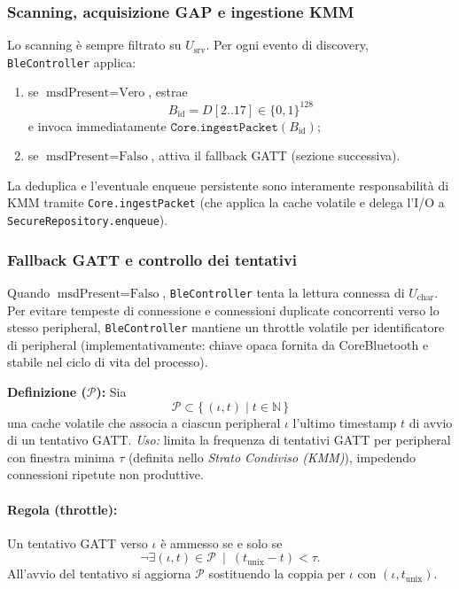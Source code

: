 \documentclass[a4paper,11pt,table,dvipsnames]{article}
\begin{document}
\subsubsection{Scanning, acquisizione GAP e ingestione KMM}
Lo scanning è sempre filtrato su \(U_{\text{srv}}\). Per ogni evento di discovery, \texttt{BleController} applica:
\begin{enumerate}
    \item se \(\text{msdPresent}=\text{Vero}\), estrae
          \[
              B_{\text{id}} = D[2..17] \in \{0,1\}^{128}
          \]
          e invoca immediatamente \(\texttt{Core.ingestPacket}(B_{\text{id}})\);
    \item se \(\text{msdPresent}=\text{Falso}\), attiva il fallback GATT (sezione successiva).
\end{enumerate}
La deduplica e l’eventuale enqueue persistente sono interamente responsabilità di KMM tramite \texttt{Core.ingestPacket} (che applica la cache volatile e delega l’I/O a \texttt{SecureRepository.enqueue}).

\subsubsection{Fallback GATT e controllo dei tentativi}
Quando \(\text{msdPresent}=\text{Falso}\), \texttt{BleController} tenta la lettura connessa di \(U_{\text{char}}\). Per evitare tempeste di connessione e connessioni duplicate concorrenti verso lo stesso peripheral, \texttt{BleController} mantiene un throttle volatile per identificatore di peripheral (implementativamente: chiave opaca fornita da CoreBluetooth e stabile nel ciclo di vita del processo).

\textbf{Definizione (\(\mathcal{P}\)):}
Sia
\[
    \mathcal{P} \subset \{\,(\iota,t)\mid t\in\mathbb{N}\,\}
\]
una cache volatile che associa a ciascun peripheral \(\iota\) l’ultimo timestamp \(t\) di avvio di un tentativo GATT.
\emph{Uso:} limita la frequenza di tentativi GATT per peripheral con finestra minima \(\tau\) (definita nello \emph{Strato Condiviso (KMM)}), impedendo connessioni ripetute non produttive.

\paragraph{Regola (throttle):}
Un tentativo GATT verso \(\iota\) è ammesso se e solo se
\[
    \neg \exists(\iota,t)\in\mathcal{P}\ \mid\ (t_{\text{unix}}-t)<\tau.
\]
All’avvio del tentativo si aggiorna \(\mathcal{P}\) sostituendo la coppia per \(\iota\) con \((\iota,t_{\text{unix}})\).
\end{document}
